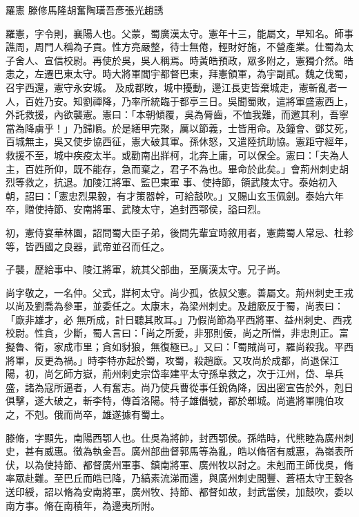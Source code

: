 
\begin{pinyinscope}
羅憲
 滕修馬隆胡奮陶璜吾彥張光趙誘



 羅憲，字令則，襄陽人也。父蒙，蜀廣漢太守。憲年十三，能屬文，早知名。師事譙周，周門人稱為子貢。性方亮嚴整，待士無倦，輕財好施，不營產業。仕蜀為太子舍人、宣信校尉。再使於吳，吳人稱焉。時黃皓預政，眾多附之，憲獨介然。皓恚之，左遷巴東太守。時大將軍閻宇都督巴東，拜憲領軍，為宇副貳。魏之伐蜀，召宇西還，憲守永安城。
 及成都敗，城中擾動，邊江長吏皆棄城走，憲斬亂者一人，百姓乃安。知劉禪降，乃率所統臨于都亭三日。吳聞蜀敗，遣將軍盛憲西上，外託救援，內欲襲憲。憲曰：「本朝傾覆，吳為脣齒，不恤我難，而邀其利，吾寧當為降虜乎！」乃歸順。於是繕甲完聚，厲以節義，士皆用命。及鐘會、鄧艾死，百城無主，吳又使步協西征，憲大破其軍。孫休怒，又遣陸抗助協。憲距守經年，救援不至，城中疾疫太半。或勸南出牂柯，北奔上庸，可以保全。憲曰：「夫為人主，百姓所仰，既不能存，急而棄之，君子不為也。畢命於此矣。」會荊州刺史胡烈等救之，抗退。加陵江將軍、監巴東軍
 事、使持節，領武陵太守。泰始初入朝，詔曰：「憲忠烈果毅，有才策器幹，可給鼓吹。」又賜山玄玉佩劍。泰始六年卒，贈使持節、安南將軍、武陵太守，追封西鄂侯，謚曰烈。



 初，憲侍宴華林園，詔問蜀大臣子弟，後問先輩宜時敘用者，憲薦蜀人常忌、杜軫等，皆西國之良器，武帝並召而任之。



 子襲，歷給事中、陵江將軍，統其父部曲，至廣漢太守。兄子尚。



 尚字敬之，一名仲。父式，牂柯太守。尚少孤，依叔父憲。善屬文。荊州刺史王戎以尚及劉喬為參軍，並委任之。太康末，為梁州刺史。及趙廞反于蜀，尚表曰：「廞非雄才，必
 無所成，計日聽其敗耳。」乃假尚節為平西將軍、益州刺史、西戎校尉。性貪，少斷，蜀人言曰：「尚之所愛，非邪則佞，尚之所憎，非忠則正。富擬魯、衛，家成市里；貪如豺狼，無復極已。」又曰：「蜀賊尚可，羅尚殺我。平西將軍，反更為禍。」時李特亦起於蜀，攻蜀，殺趙廞。又攻尚於成都，尚退保江陽，初，尚乞師方嶽，荊州刺史宗岱率建平太守孫阜救之，次于江州，岱、阜兵盛，諸為寇所逼者，人有奮志。尚乃使兵曹從事任銳偽降，因出密宣告於外，剋日俱擊，遂大破之，斬李特，傳首洛陽。特子雄僭號，都於郫城。尚遣將軍隗伯攻之，不剋。俄而尚卒，雄遂據有蜀土。



 滕脩，字顯先，南陽西鄂人也。仕吳為將帥，封西鄂侯。孫皓時，代熊睦為廣州刺史，甚有威惠。徵為執金吾。廣州部曲督郭馬等為亂，皓以脩宿有威惠，為嶺表所伏，以為使持節、都督廣州軍事、鎮南將軍、廣州牧以討之。未剋而王師伐吳，脩率眾赴難。至巴丘而皓已降，乃縞素流涕而還，與廣州刺史閭豐、蒼梧太守王毅各送印綬，詔以脩為安南將軍，廣州牧、持節、都督如故，封武當侯，加鼓吹，委以南方事。脩在南積年，為邊夷所附。




\end{pinyinscope}
